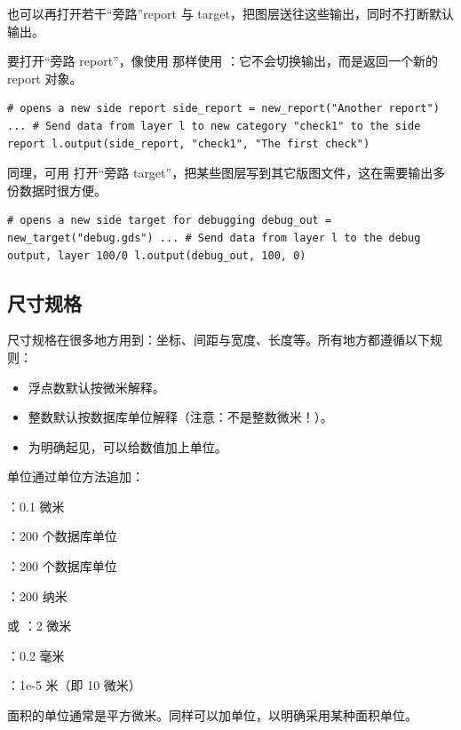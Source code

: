 也可以再打开若干“旁路”report 与 target，把图层送往这些输出，同时不打断默认输出。

要打开“旁路 report”，像使用  那样使用 ：它不会切换输出，而是返回一个新的 report 对象。

\begin{lstlisting}
# opens a new side report side_report = new_report("Another report") ... # Send data from layer l to new category "check1" to the side report l.output(side_report, "check1", "The first check")
\end{lstlisting}

同理，可用  打开“旁路 target”，把某些图层写到其它版图文件，这在需要输出多份数据时很方便。

\begin{lstlisting}
# opens a new side target for debugging debug_out = new_target("debug.gds") ... # Send data from layer l to the debug output, layer 100/0 l.output(debug_out, 100, 0)
\end{lstlisting}

\subsection{尺寸规格}

尺寸规格在很多地方用到：坐标、间距与宽度、长度等。所有地方都遵循以下规则：

\begin{itemize}
\item 浮点数默认按微米解释。
\item 整数默认按数据库单位解释（注意：不是整数微米！）。
\item 为明确起见，可以给数值加上单位。
\end{itemize}

单位通过单位方法追加：

\begin{kldesc}
\item {}：0.1 微米
\item {}：200 个数据库单位
\item {}：200 个数据库单位
\item {}：200 纳米
\item {} 或 ：2 微米
\item {}：0.2 毫米
\item {}：1e-5 米（即 10 微米）
\end{kldesc}

面积的单位通常是平方微米。同样可以加单位，以明确采用某种面积单位。

